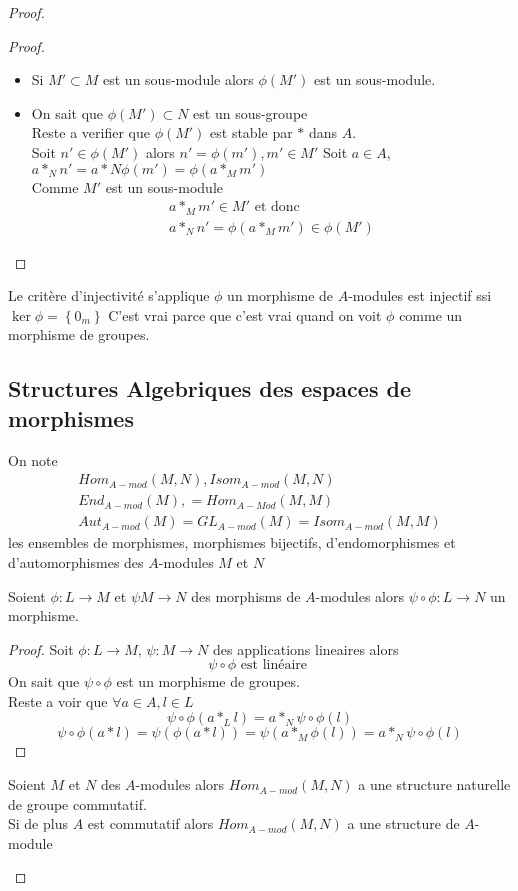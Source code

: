 \documentclass[../main.tex]{subfiles}
\begin{document}
\begin{proof}
\begin{proof}
\begin{itemize}
	\item Si $M' \subset M$ est un sous-module alors $\phi(M')$ est un sous-module.
	\item On sait que $\phi(M') \subset N$ est un sous-groupe\\
		Reste a verifier que $\phi(M')$ est stable par $\ast$ dans $A$.\\
		Soit $n' \in \phi(M')$ alors $n' = \phi(m') , m' \in M'$
		Soit $a \in A$, $a \ast_N n' = a \ast N \phi(m')= \phi(a \ast_M m')$\\
		Comme $M'$ est un sous-module 
		\begin{align*}
		a \ast_M m' \in M' \text{ et donc } \\
		a \ast_N n' = \phi(a \ast_M m') \in \phi(M')
		\end{align*}
		
\end{itemize}
\end{proof}
\begin{rmq}
Le critère d'injectivité s'applique $\phi$ un morphisme de $A$-modules est injectif ssi $\ker \phi = \left\{ 0_m \right\} $ C'est vrai parce que c'est vrai quand on voit $\phi$ comme un morphisme de groupes.
\end{rmq}
\subsection{Structures Algebriques des espaces de morphismes}
\begin{defn}
On note
\begin{align*}
	Hom_{A-mod} ( M,N) , Isom_{A-mod} ( M,N)\\
	End_{A-mod} ( M),= Hom_{A-Mod} (M,M)\\
	Aut_{A-mod} ( M) = GL_{A-mod}(M) = Isom_{A-mod} ( M,M) 
\end{align*}
les ensembles de morphismes, morphismes bijectifs, d'endomorphismes et d'automorphismes des $A$-modules $M$ et $N$

\end{defn}
\begin{propo}
Soient $\phi: L \to M$ et $\psi M \to N$ des morphisms de $A$-modules alors $\psi \circ \phi : L \to N$ un morphisme.
\end{propo}
\begin{proof}
Soit $\phi: L \to M$, $\psi : M \to N$ des applications lineaires alors
\[ 
\psi \circ \phi \text{ est linéaire } 
\]
On sait que $\psi \circ \phi$ est un morphisme de groupes.\\
Reste a voir que $\forall a \in A, l \in L$ 
\[ 
	\psi \circ \phi ( a \ast_L l)= a \ast_N \psi \circ \phi ( l)
\]
\[ 
	\psi \circ \phi ( a \ast l) = \psi ( \phi(a \ast l)) = \psi( a \ast_M \phi(l)) = a \ast_N \psi\circ\phi (l )
\]
\end{proof}
\begin{propo}
	Soient $M$ et $N$ des $A$-modules alors $Hom_{A-mod} ( M,N)$ a une structure naturelle de groupe commutatif. \\
	Si de plus $A$ est commutatif alors $Hom _{A-mod} ( M,N)$ a une structure de $A$-module
\end{propo}


\end{proof}
\end{document}
